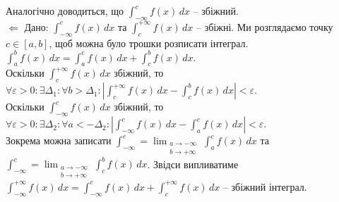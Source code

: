 \documentclass[a4paper, 10pt]{article}
\def\leftproof{$\boxed{\Leftarrow}$ }
\theoremstyle{theoremdd}
\theoremstyle{theoremdd}
\theoremstyle{theoremdd}
\theoremstyle{theoremdd}
\theoremstyle{theoremdd}
\theoremstyle{theoremdd}
\theoremstyle{theoremdd}
\theoremstyle{theoremdd}
\theoremstyle{theoremdd}
\begin{document}

Аналогічно доводиться, що $\displaystyle\int_{-\infty}^{c} f(x)\,dx$ -- збіжний.
\bigskip \\
\leftproof Дано: $\displaystyle\int_{-\infty}^c f(x)\,dx$ та $\displaystyle\int_c^{+\infty} f(x)\,dx$ -- збіжні. Ми розглядаємо точку $c \in [a,b]$, щоб можна було трошки розписати інтеграл.\\
$\displaystyle\int_a^b f(x)\,dx = \int_a^c f(x)\,dx + \int_c^b f(x)\,dx$.\\
Оскільки $\displaystyle\int_c^{+\infty} f(x)\,dx$ збіжний, то $\forall \varepsilon > 0: \exists \Delta_1: \forall b > \Delta_1: \displaystyle\left| \int_c^{+\infty} f(x)\,dx - \int_c^b f(x)\,dx \right| < \varepsilon$.\\
Оскільки $\displaystyle\int_{-\infty}^{c} f(x)\,dx$ збіжний, то $\forall \varepsilon > 0: \exists \Delta_2: \forall a < -\Delta_2: \displaystyle\left| \int_{-\infty}^{c} f(x)\,dx - \int_a^c f(x)\,dx \right| < \varepsilon$.\\
Зокрема можна записати $\displaystyle\int_{-\infty}^c = \lim_{\substack{a \to -\infty \\ b \to +\infty}} \int_a^c f(x)\,dx$ та $\displaystyle\int_{-\infty}^c = \lim_{\substack{a \to -\infty \\ b \to +\infty}} \int_c^b f(x)\,dx$. Звідси випливатиме\\
$\displaystyle\int_{-\infty}^{+\infty} f(x)\,dx = \int_{-\infty}^c f(x)\,dx + \int_c^{+\infty} f(x)\,dx$ -- збіжний інтеграл.
\end{document}
